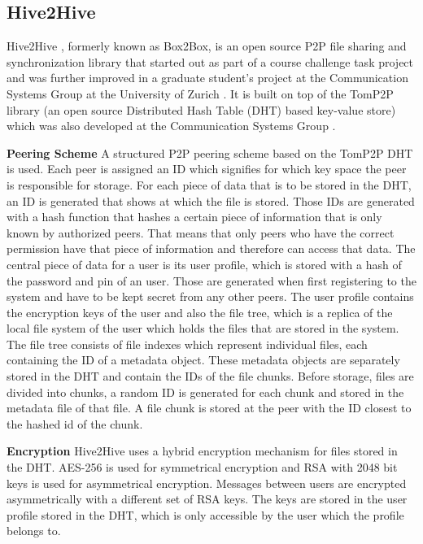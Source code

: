 \subsection{Hive2Hive}
Hive2Hive \cite{hive2hive}, formerly known as Box2Box, is an open source P2P file sharing and synchronization library that started out as part of a course challenge task project and was further improved in a graduate student's project at the Communication Systems Group at the University of Zurich \cite{hive2hive:about}. It is built on top of the TomP2P library (an open source Distributed Hash Table (DHT) based key-value store) which was also developed at the Communication Systems Group \cite{tomp2p}.

\textbf{Peering Scheme}
A structured P2P peering scheme based on the TomP2P DHT is used. Each peer is assigned an ID which signifies for which key space the peer is responsible for storage. For each piece of data that is to be stored in the DHT, an ID is generated that shows at which the file is stored. Those IDs are generated with a hash function that hashes a certain piece of information that is only known by authorized peers. That means that only peers who have the correct permission have that piece of information and therefore can access that data.
The central piece of data for a user is its user profile, which is stored with a hash of the password and pin of an user. Those are generated when first registering to the system and have to be kept secret from any other peers. The user profile contains the encryption keys of the user and also the file tree, which is a replica of the local file system of the user which holds the files that are stored in the system. The file tree consists of file indexes which represent individual files, each containing the ID of a metadata object. These metadata objects are separately stored in the DHT and contain the IDs of the file chunks. Before storage, files are divided into chunks, a random ID is generated for each chunk and stored in the metadata file of that file. A file chunk is stored at the peer with the ID closest to the hashed id of the chunk.

\textbf{Encryption}
Hive2Hive uses a hybrid encryption mechanism for files stored in the DHT. AES-256 is used for symmetrical encryption and RSA with 2048 bit keys is used for asymmetrical encryption. Messages between users are encrypted asymmetrically with a different set of RSA keys.
The keys are stored in the user profile stored in the DHT, which is only accessible by the user which the profile belongs to.

